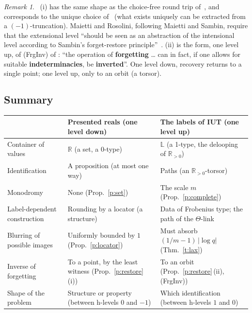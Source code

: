 \documentclass[11pt,a4paper]{article}
\newcommand{\R}{\mathbb{R}}
\newcommand{\Rp}{\mathbb{R}_{>0}}
\newcommand{\LL}{\mathbb{L}}
\newcommand{\lab}[2]{{\upshape\fcolorbox{#1}{#1!8}{\scriptsize\sffamily\bfseries\textcolor{#1}{#2}}}}
\newcommand{\tagH}{\lab{BurntOrange}{H}}
\newcommand{\q}[1]{``#1''}
\theoremstyle{plain}
\theoremstyle{definition}
\theoremstyle{remark}
\newtheorem{remark}[theorem]{Remark}
\begin{document}
\begin{remark}\label{r:restore}\tagH\ 
(i) has the same shape as the choice-free round trip of~\cite[Appendix~B.12]{U}, and corresponds to the unique choice
of~\cite{RS} (what exists uniquely can be extracted from a $(-1)$-truncation). Maietti and Rosolini, following Maietti and
Sambin, require that the extensional level \q{should be seen as an abstraction of the intensional level according to
Sambin's forget-restore principle}~\cite[Introduction]{MR}. (ii) is the form, one level up, of (FrgInv) of
\cite[\S3.11]{Ess}: \q{the operation of \textbf{forgetting} \dots{} can in fact, if one allows for suitable
\textbf{indeterminacies}, be \textbf{inverted}}. One level down, recovery returns to a single point; one level up, only to an orbit
(a torsor).
\end{remark}

\subsection{Summary}
{\small
\begin{center}
\begin{tabularx}{\linewidth}{@{}>{\raggedright\arraybackslash}p{3.0cm}>{\raggedright\arraybackslash}X>{\raggedright\arraybackslash}X@{}}
\toprule
& Presented reals (one level down) & The labels of IUT (one level up)\\
\midrule
Container of values & $\R$ (a set, a 0-type) & $\LL$ (a 1-type, the delooping of $\Rp$)\\
Identification & A proposition (at most one way) & Paths (an $\Rp$-torsor)\\
Monodromy & None (Prop.~\ref{p:set}) & The scale $m$ (Prop.~\ref{p:complete})\\
Label-dependent construction & Rounding by a locator (a structure) & Data of Frobenius type; the path of the
$\Theta$-link\\
Blurring of possible images & Uniformly bounded by $1$ (Prop.~\ref{p:locator}) & Must absorb $(1/m-1)\,|\log q|$
(Thm.~\ref{t:lax})\\
Inverse of forgetting & To a point, by the least witness (Prop.~\ref{p:restore}\,(i)) & To an orbit
(Prop.~\ref{p:restore}\,(ii), (FrgInv))\\
Shape of the problem & Structure or property (between h-levels $0$ and $-1$) & Which identification (between h-levels
$1$ and $0$)\\
\bottomrule
\end{tabularx}
\end{center}
}
\end{document}
